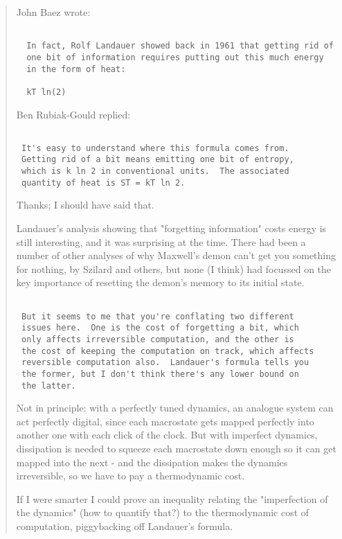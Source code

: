\begin{quote}
John Baez wrote:


\begin{verbatim}

  In fact, Rolf Landauer showed back in 1961 that getting rid of 
  one bit of information requires putting out this much energy 
  in the form of heat:
  
  kT ln(2)
\end{verbatim}
    

Ben Rubiak-Gould replied:


\begin{verbatim}

 It's easy to understand where this formula comes from.  
 Getting rid of a bit means emitting one bit of entropy, 
 which is k ln 2 in conventional units.  The associated 
 quantity of heat is ST = kT ln 2.
\end{verbatim}
    

Thanks; I should have said that.  

 Landauer's analysis showing that "forgetting information" costs
 energy is still interesting, and it was surprising at the time.  
 There had been a number of other analyses of why Maxwell's demon
 can't get you something for nothing, by Szilard and others, but
 none (I think) had focussed on the key importance of resetting
 the demon's memory to its initial state.


\begin{verbatim}

 But it seems to me that you're conflating two different 
 issues here.  One is the cost of forgetting a bit, which 
 only affects irreversible computation, and the other is 
 the cost of keeping the computation on track, which affects 
 reversible computation also.  Landauer's formula tells you 
 the former, but I don't think there's any lower bound on 
 the latter.
\end{verbatim}
    
 Not in principle: with a perfectly tuned dynamics, an analogue 
 system can act perfectly digital, since each macrostate gets mapped
 perfectly into another one with each click of the clock.  But with
 imperfect dynamics, dissipation is needed to squeeze each macrostate
 down enough so it can get mapped into the next - and the dissipation 
 makes the dynamics irreversible, so we have to pay a thermodynamic cost.  
 
 If I were smarter I could prove an inequality relating the "imperfection 
 of the dynamics" (how to quantify that?) to the thermodynamic cost
 of computation, piggybacking off Landauer's formula.  
\end{quote}

